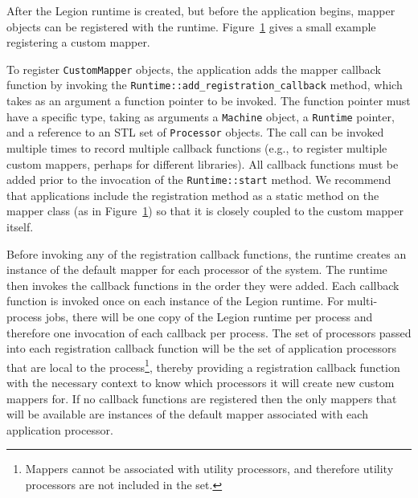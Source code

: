After the Legion runtime is created, but before the application 
begins, mapper objects can be registered 
with the runtime. Figure~\ref{fig:mapper_registration} gives a small
example registering a custom mapper.

\begin{figure}

\caption{}
\label{fig:mapper_registration}
\end{figure}

To register {\tt CustomMapper} objects, the
application adds the mapper callback function by invoking the
{\tt Runtime::add\_registration\_callback} method, which takes as an
argument a function pointer to be invoked. The function pointer must
have a specific type, taking as arguments a {\tt Machine} object, 
a {\tt Runtime} pointer, and a reference to an STL set of {\tt Processor}
objects. The call can be invoked multiple times to record multiple
callback functions (e.g., to register multiple custom mappers, perhaps for different libraries). All
callback functions must be added prior to the invocation of the 
{\tt Runtime::start} method. We recommend that applications include the registration
method as a static method on the mapper class (as in Figure~\ref{fig:mapper_registration})
so that it is closely coupled to the custom mapper itself.

Before invoking any of the registration callback functions, the runtime 
creates an instance of the default mapper for each processor of
the system. The runtime then invokes the callback functions in the order
they were added. Each callback function is invoked once on each 
instance of the Legion runtime. For multi-process jobs, there will be 
one copy of the Legion runtime per process and therefore one invocation
of each callback per process. The set of processors passed into each 
registration callback function will be the set of application processors 
that are local to the process\footnote{Mappers cannot be associated with
utility processors, and therefore utility processors are not included
in the set.}, thereby providing a registration callback
function with the necessary context to know which processors it
will create new custom mappers for. 
If no callback functions are registered then the only mappers
that will be available are instances of the default mapper associated
with each application processor.

